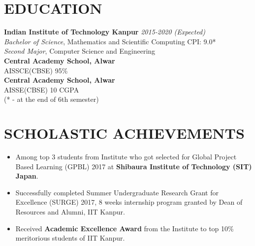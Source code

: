 \documentclass[margin]{res}
\begin{document}
\begin{resume}

\section{EDUCATION}
\textbf{Indian Institute of Technology Kanpur} \hfill \textit{2015-2020 (Expected)}\\
{\sl Bachelor of Science}, Mathematics and Scientific Computing \hfill CPI: 
9.0*
\\
{\sl Second Major}, Computer Science and Engineering \\
\textbf{Central Academy School, Alwar}\\
AISSCE(CBSE) \hfill 95\% \\
\textbf{Central Academy School, Alwar}\\
AISSE(CBSE) \hfill 10 CGPA \\
{\small (* -  at the end of 6th semester)}
\section{SCHOLASTIC ACHIEVEMENTS}
\begin{itemize}
\item Among top 3 students from Institute who got selected for Global Project Based Learning (GPBL) 2017 at
\textbf{Shibaura Institute of Technology (SIT) Japan}.
\item Successfully completed Summer Undergraduate Research Grant for Excellence (SURGE) 2017, 8 weeks internship program granted by Dean of Resources and Alumni, IIT Kanpur.
\item Received \textbf{Academic Excellence Award}  from the Institute to top 10\% meritorious students of IIT Kanpur.
\end{itemize}


\end{resume}
\end{document}
